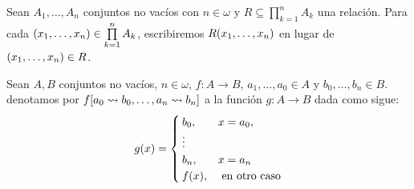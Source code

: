 \begin{notation}
	Sean $A_{1},\dotsc, A_{n}$ conjuntos no vacíos con $n\in\omega$ y $R\subseteq\prod\limits_{k = 1}^{n}A_{k}$ una relación. Para cada $\pa*{x_{1},\dotsc, x_{n}}\in\prod\limits_{k = 1}^{n}A_{k}$, escribiremos $R\pa*{x_{1},\dotsc, x_{n}}$ en lugar de $\pa*{x_{1},\dotsc, x_{n}}\in R$.
\end{notation}

\begin{notation}
	Sean $A, B$ conjuntos no vacíos, $n\in\omega$, $f: A\to B$, $a_{1},\dotsc, a_{0}\in A$ y $b_{0},\dotsc, b_{n}\in B$. denotamos por $f\bra*{a_{0}\leadsto b_{0},\dotsc, a_{n}\leadsto b_{n}}$ a la función $g: A\to B$ dada como sigue:
	\[
		g\pa*{x} =
		\begin{cases}
			b_{0}, & x = a_{0},\\
			\vdots &\\
			b_{n}, & x = a_{n}\\
			f\pa*{x}, &\text{ en otro caso}
		\end{cases}
	\]
\end{notation}

